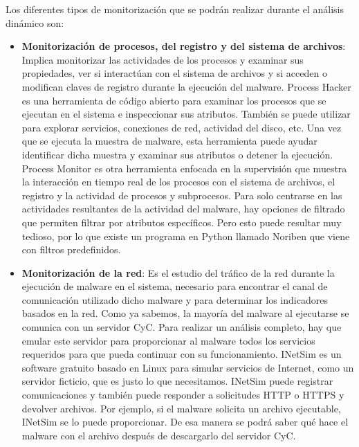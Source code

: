 \begin{itemize}
    Los diferentes tipos de monitorización que se podrán realizar durante el análisis dinámico son\cite{75}:
\begin{itemize}
\item \textbf{Monitorización de procesos, del registro y del sistema de archivos}: Implica monitorizar las actividades de los procesos y examinar sus propiedades, ver si interactúan con el sistema de archivos y si acceden o modifican claves de registro durante la ejecución del malware. Process Hacker \cite{93} es una herramienta de código abierto para examinar los procesos que se ejecutan en el sistema e inspeccionar sus atributos. También se puede utilizar para explorar servicios, conexiones de red, actividad del disco, etc. Una vez que se ejecuta la muestra de malware, esta herramienta puede ayudar identificar dicha muestra y examinar sus atributos o detener la ejecución. Process Monitor \cite{94} es otra herramienta enfocada en la supervisión que muestra la interacción en tiempo real de los procesos con el sistema de archivos, el registro y la actividad de procesos y subprocesos. Para solo centrarse en las actividades resultantes de la actividad del malware, hay opciones de filtrado que permiten filtrar por atributos específicos. Pero esto puede resultar muy tedioso, por lo que existe un programa en Python llamado Noriben \cite{95} que viene con filtros predefinidos. 
\item \textbf{Monitorización de la red}: Es el estudio del tráfico de la red durante la ejecución de malware en el sistema, necesario para encontrar el canal de comunicación utilizado dicho malware y para determinar los indicadores basados en la red. Como ya sabemos, la mayoría del malware al ejecutarse se comunica con un servidor \gls{CyC}. Para realizar un análisis completo, hay que emular este servidor para proporcionar al malware todos los servicios requeridos para que pueda continuar con su funcionamiento. INetSim \cite{91} es un software gratuito basado en Linux para simular servicios de Internet, como un servidor ficticio, que es justo lo que necesitamos. INetSim puede registrar comunicaciones y también puede responder a solicitudes \gls{HTTP} o \gls{HTTPS} y devolver archivos. Por ejemplo, si el malware solicita un archivo ejecutable, INetSim se lo puede proporcionar. De esa manera se podrá saber qué hace el malware con el archivo después de descargarlo del servidor \gls{CyC}.
\end{itemize}
    

\end{itemize}

